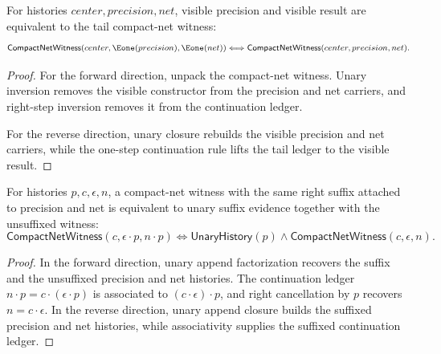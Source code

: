 \begin{theorem}
\label{thm:compact-net-witness-right-e1-result-iff}
For histories $center,precision,net$, visible precision and visible result
are equivalent to the tail compact-net witness:
$$
\mathsf{CompactNetWitness}(center,\Eone(precision),\Eone(net))
\Longleftrightarrow
\mathsf{CompactNetWitness}(center,precision,net).
$$
\end{theorem}
\begin{proof}
For the forward direction, unpack the compact-net witness. Unary inversion
removes the visible constructor from the precision and net carriers, and
right-step inversion removes it from the continuation ledger.

For the reverse direction, unary closure rebuilds the visible precision and
net carriers, while the one-step continuation rule lifts the tail ledger to
the visible result.
\end{proof}

\begin{theorem}
\label{thm:compact-net-witness-suffix-iff}
For histories $p,c,\epsilon,n$, a compact-net witness with the same right
suffix attached to precision and net is equivalent to unary suffix evidence
together with the unsuffixed witness:
$$
\mathsf{CompactNetWitness}(c,\epsilon\cdot p,n\cdot p)
\Longleftrightarrow
\mathsf{UnaryHistory}(p)\wedge
\mathsf{CompactNetWitness}(c,\epsilon,n).
$$
\end{theorem}
\begin{proof}
In the forward direction, unary append factorization recovers the suffix and
the unsuffixed precision and net histories. The continuation ledger
$n\cdot p=c\cdot(\epsilon\cdot p)$ is associated to
$(c\cdot\epsilon)\cdot p$, and right cancellation by $p$ recovers
$n=c\cdot\epsilon$. In the reverse direction, unary append closure builds the
suffixed precision and net histories, while associativity supplies the
suffixed continuation ledger.
\end{proof}


